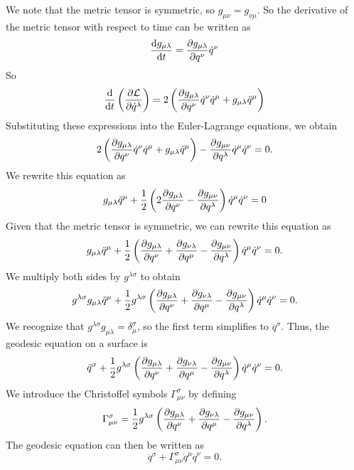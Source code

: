 \documentclass[12pt]{article}
\begin{document}
We note that the metric tensor is symmetric, so $g_{\mu\nu} = g_{\nu\mu}$.
So the derivative of the metric tensor with respect to time can be written as
\[
\dv{g_{\mu\lambda}}{t} = \pdv{g_{\mu\lambda}}{q^{\nu}} \dot{q}^{\nu} 
\]
So 
\[
\dv{t} \left( \pdv{\mathcal{L}}{\dot{q}^{\lambda}} \right) = 2 \left(\pdv{g_{\mu\lambda}}{q^{\nu}} \dot{q}^{\nu} \dot{q}^{\mu} + g_{\mu\lambda} \ddot{q}^{\mu} \right)
\] 
Substituting these expressions into the Euler-Lagrange equations, we obtain
\[
2 \left(\pdv{g_{\mu\lambda}}{q^{\nu}} \dot{q}^{\nu} \dot{q}^{\mu} + g_{\mu\lambda} \ddot{q}^{\mu} \right) - \pdv{g_{\mu\nu}}{q^{\lambda}} \dot{q}^{\mu} \dot{q}^{\nu} = 0.
\]
We rewrite this equation as
\[
g_{\mu\lambda} \ddot{q}^{\mu} + \frac{1}{2} \left(2\pdv{g_{\mu\lambda}}{q^{\nu}} -  \pdv{g_{\mu\nu}}{q^{\lambda}} \right) \dot{q}^{\mu} \dot{q}^{\nu} = 0
\]
Given that the metric tensor is symmetric, we can rewrite this equation as
\[
g_{\mu\lambda} \ddot{q}^{\mu} + \frac{1}{2} \left( \pdv{g_{\mu\lambda}}{q^{\nu}} + \pdv{g_{\nu\lambda}}{q^{\mu}} - \pdv{g_{\mu\nu}}{q^{\lambda}} \right) \dot{q}^{\mu} \dot{q}^{\nu} = 0.
\]
We multiply both sides by \(g^{\lambda\sigma}\) to obtain
\[
g^{\lambda\sigma} g_{\mu\lambda} \ddot{q}^{\mu} + \frac{1}{2} g^{\lambda\sigma} \left( \pdv{g_{\mu\lambda}}{q^{\nu}} + \pdv{g_{\nu\lambda}}{q^{\mu}} - \pdv{g_{\mu\nu}}{q^{\lambda}} \right) \dot{q}^{\mu} \dot{q}^{\nu} = 0.
\]
We recognize that \(g^{\lambda\sigma} g_{\mu\lambda} = \delta_{\mu}^{\sigma}\), so the first term simplifies to \(\ddot{q}^{\sigma}\).
Thus, the geodesic equation on a surface is
\[
\ddot{q}^{\sigma} + \frac{1}{2} g^{\lambda\sigma} \left( \pdv{g_{\mu\lambda}}{q^{\nu}} + \pdv{g_{\nu\lambda}}{q^{\mu}} - \pdv{g_{\mu\nu}}{q^{\lambda}} \right) \dot{q}^{\mu} \dot{q}^{\nu} = 0.
\]
We introduce the Christoffel symbols \(\Gamma_{\mu\nu}^{\sigma}\) by defining
\[
   \Gamma_{\mu\nu}^{\sigma} = \frac{1}{2} g^{\lambda\sigma} \left( \pdv{g_{\mu\lambda}}{q^{\nu}} + \pdv{g_{\nu\lambda}}{q^{\mu}} - \pdv{g_{\mu\nu}}{q^{\lambda}} \right).
\]
The geodesic equation can then be written as
\begin{equation}
    \ddot{q}^{\sigma} + \Gamma_{\mu\nu}^{\sigma} \dot{q}^{\mu} \dot{q}^{\nu} = 0.
\end{equation}
\end{document}
